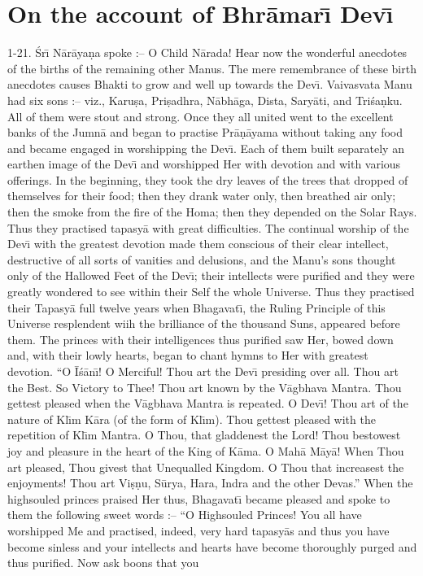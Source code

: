 \chapter{On the account of Bhr\=amar\={\i} Dev\={\i}}

1-21. \'Sr\={\i} N\=ar\=aya\d{n}a spoke :-- O Child N\=arada! Hear now the wonderful anecdotes of the births of the remaining other Manus. The mere remembrance of these birth anecdotes causes Bhakti to grow and well up towards the Dev\={\i}. Vaivasvata Manu had six sons :-- viz., Karu\d{s}a, Pri\d{s}adhra, N\=abh\=aga, Dista, Sary\=ati, and Tri\'sa\d{n}ku. All of them were stout and strong. Once they all united went to the excellent banks of the Jumn\=a and began to practise Pr\=a\d{n}\=ayama without taking any food and became engaged in worshipping the Dev\={\i}. Each of them built separately an earthen image of the Dev\={\i} and worshipped Her with devotion and with various offerings. In the beginning, they took the dry leaves of the trees that dropped of themselves for their food; then they drank water only, then breathed air only; then the smoke from the fire of the Homa; then they depended on the Solar Rays. Thus they practised tapasy\=a with great difficulties. The continual worship of the Dev\={\i} with the greatest devotion made them conscious of their clear intellect, destructive of all sorts of vanities and delusions, and the Manu's sons thought only of the Hallowed Feet of the Dev\={\i}; their intellects were purified and they were greatly wondered to see within their Self the whole Universe. Thus they practised their Tapasy\=a full twelve years when Bhagavat\={\i}, the Ruling Principle of this Universe resplendent wiih the brilliance of the thousand Suns, appeared before them. The princes with their intelligences thus purified saw Her, bowed down and, with their lowly hearts, began to chant hymns to Her with greatest devotion. ``O \=I\'s\=an\={\i}! O Merciful! Thou art the Dev\={\i} presiding over all. Thou art the Best. So Victory to Thee! Thou art known by the V\=agbhava Mantra. Thou gettest pleased when the V\=agbhava Mantra is repeated. O Dev\={\i}! Thou art of the nature of Kl\={\i}m K\=ara (of the form of Kl\={\i}m). Thou gettest pleased with the repetition of Kl\={\i}m Mantra. O Thou, that gladdenest the Lord! Thou bestowest joy and pleasure in the heart of the King of K\=ama. O Mah\=a M\=ay\=a! When Thou art pleased, Thou givest that Unequalled Kingdom. O Thou that increasest the enjoyments! Thou art Vi\d{s}\d{n}u, S\=urya, Hara, Indra and the other Devas.'' When the highsouled princes praised Her thus, Bhagavat\={\i} became pleased and spoke to them the following sweet words :-- ``O Highsouled Princes! You all have worshipped Me and practised, indeed, very hard tapasy\=as and thus you have become sinless and your intellects and hearts have become thoroughly purged and thus purified. Now ask boons that you

